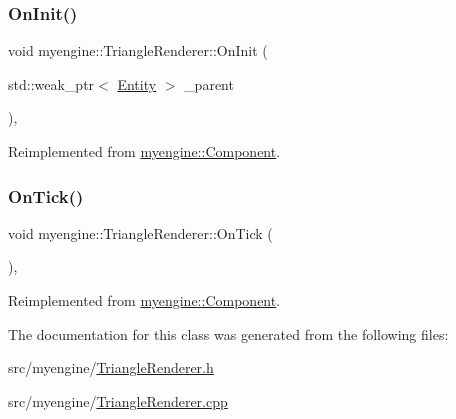 \subsubsection{\texorpdfstring{On\+Init()}{OnInit()}}
{\footnotesize\ttfamily void myengine\+::\+Triangle\+Renderer\+::\+On\+Init (\begin{DoxyParamCaption}\item[{std\+::weak\+\_\+ptr$<$ \hyperlink{classmyengine_1_1_entity}{Entity} $>$}]{\+\_\+parent }\end{DoxyParamCaption})\hspace{0.3cm}{\ttfamily [override]}, {\ttfamily [virtual]}}



Reimplemented from \hyperlink{classmyengine_1_1_component_a66aeffd4cb32f438a4fc604e74e50057}{myengine\+::\+Component}.

\mbox{\label{classmyengine_1_1_triangle_renderer_a6608a9c7954cff50e2575133dd6e5d88}} 
\subsubsection{\texorpdfstring{On\+Tick()}{OnTick()}}
{\footnotesize\ttfamily void myengine\+::\+Triangle\+Renderer\+::\+On\+Tick (\begin{DoxyParamCaption}{ }\end{DoxyParamCaption})\hspace{0.3cm}{\ttfamily [override]}, {\ttfamily [virtual]}}



Reimplemented from \hyperlink{classmyengine_1_1_component_ac84472ba368a622afa0e25c47757291a}{myengine\+::\+Component}.



The documentation for this class was generated from the following files\+:\begin{DoxyCompactItemize}
\item 
src/myengine/\hyperlink{_triangle_renderer_8h}{Triangle\+Renderer.\+h}\item 
src/myengine/\hyperlink{_triangle_renderer_8cpp}{Triangle\+Renderer.\+cpp}\end{DoxyCompactItemize}

